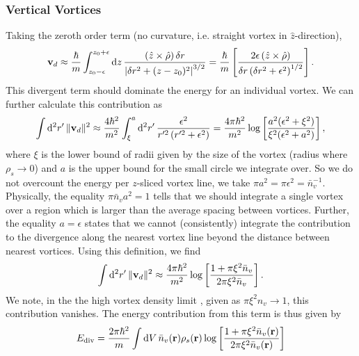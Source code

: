 \documentclass[onecolumn,nofootinbib,superscriptaddress]{revtex4}
\newcommand{\dd}[1]{\mathrm{d}#1\,}
\begin{document}
\subsubsection{Vertical Vortices}
Taking the zeroth order term (no curvature, i.e. straight vortex in $\hat{z}$-direction),
\begin{equation}
{\bf v}_d \approx \frac{\hbar}{m}\int_{z_0-\epsilon}^{z_0+\epsilon} \dd{z}\frac{\left(\hat{z}\times\hat{\rho}\right)\delta r}{\left|\delta r^2 + (z-z_0)^2\right|^{3/2}} = \frac{\hbar}{m}\left[\frac{2\epsilon\left(\hat{z}\times\hat{\rho}\right)}{\delta r \left(\delta r^2 + \epsilon^2\right)^{1/2}}\right].\label{EQ:VertVeld}
\end{equation}
This divergent term should dominate the energy for an individual vortex.  We can further calculate this contribution as
\begin{equation}
\int \dd{^2 r'} \|{\bf v}_d\|^2 \approx \frac{4\hbar^2}{m^2}\int_\xi^a \dd{^2 r'}\frac{\epsilon^2}{r'^2\left(r'^2+\epsilon^2\right)} = \frac{4\pi \hbar^2}{m^2}\log\left[\frac{a^2(\epsilon^2+\xi^2)}{\xi^2(\epsilon^2+a^2)}\right],
\end{equation}
where $\xi$ is the lower bound of radii given by the size of the vortex (radius where $\rho_s \rightarrow 0$) and $a$ is the upper bound for the small circle we integrate over.  So we do not overcount the energy per $z$-sliced vortex line, we take $\pi a^2=\pi \epsilon^2 = \bar{n}_v^{-1}$.  Physically, the equality $\pi \bar{n}_v a^2 = 1$ tells that we should integrate a single vortex over a region which is larger than the average spacing between vortices.  Further, the equality $a = \epsilon$ states that we cannot (consistently) integrate the contribution to the divergence along the nearest vortex line beyond the distance between nearest vortices.  Using this definition, we find
\begin{equation}
\int \dd{^2 r'} \|{\bf v}_d\|^2 \approx \frac{4\pi \hbar^2}{m^2}\log\left[\frac{1+\pi \xi^2 \bar{n}_v}{2\pi \xi^2 \bar{n}_v}\right].
\end{equation}
We note, in the the high vortex density limit \cite{Sheehy:2004}, given as $\pi \xi^2 n_v \rightarrow 1$, this contribution vanishes.  The energy contribution from this term is thus given by
\begin{equation}
E_\text{div} = \frac{2\pi \hbar^2}{m}\int\dd{V} \bar{n}_v({\bf r}) \rho_s({\bf r})\log\left[\frac{1+\pi \xi^2 \bar{n}_v({\bf r})}{2\pi \xi^2 \bar{n}_v({\bf r})}\right] \label{EQ:VertVelE}
\end{equation}
\end{document}
